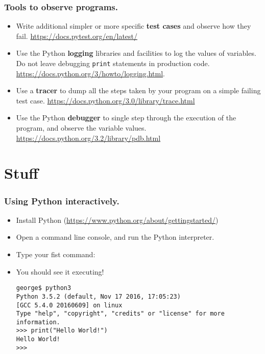 \documentclass{beamer} %
\newcommand\emc[1]{\textcolor{brightblue}{\textbf{#1}}}
\begin{document}
\begin{frame}
\frametitle{Tools to observe programs.}

\begin{itemize}
\item Write additional simpler or more specific \emc{test cases} and observe how they fail. \url{https://docs.pytest.org/en/latest/}
\item Use the Python \emc{logging} libraries and facilities to log the values of variables. Do not leave debugging \texttt{print} statements in production code. \url{https://docs.python.org/3/howto/logging.html}.
\item Use a \emc{tracer} to dump all the steps taken by your program on a simple failing test case. \url{https://docs.python.org/3.0/library/trace.html}
\item Use the Python \emc{debugger} to single step through the execution of the program, and observe the variable values. \url{https://docs.python.org/3.2/library/pdb.html}
\end{itemize}

\end{frame}

\section{Stuff}

\begin{frame}[fragile]
\frametitle{Using Python interactively.} 

\begin{itemize}
	\item Install Python (\url{https://www.python.org/about/gettingstarted/})
	\item Open a command line console, and run the Python interpreter.
	\item Type your fist command: 
	\item You should see it executing!

\begin{Verbatim}[fontsize=\footnotesize]
george$ python3
Python 3.5.2 (default, Nov 17 2016, 17:05:23) 
[GCC 5.4.0 20160609] on linux
Type "help", "copyright", "credits" or "license" for more information.
>>> print("Hello World!")
Hello World!
>>>
\end{Verbatim}

\end{itemize}

\end{frame}




\end{document}

